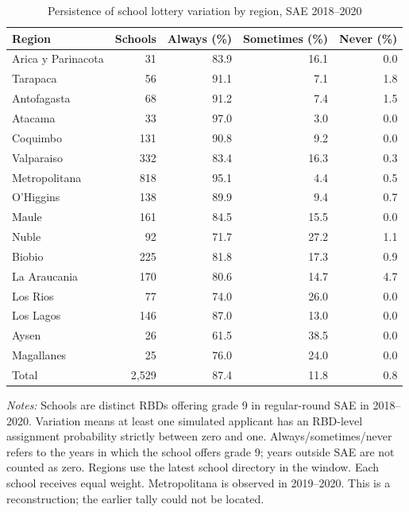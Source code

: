 \begin{table}[!htbp]\centering
\caption{Persistence of school lottery variation by region, SAE 2018--2020}
\label{tab:lottery-variation-region}
\small
\begin{tabular}{lrrrr}\hline\hline
Region & Schools & Always (\%) & Sometimes (\%) & Never (\%) \\ \hline
Arica y Parinacota & 31 & 83.9 & 16.1 & 0.0 \\
Tarapaca & 56 & 91.1 & 7.1 & 1.8 \\
Antofagasta & 68 & 91.2 & 7.4 & 1.5 \\
Atacama & 33 & 97.0 & 3.0 & 0.0 \\
Coquimbo & 131 & 90.8 & 9.2 & 0.0 \\
Valparaiso & 332 & 83.4 & 16.3 & 0.3 \\
Metropolitana & 818 & 95.1 & 4.4 & 0.5 \\
O'Higgins & 138 & 89.9 & 9.4 & 0.7 \\
Maule & 161 & 84.5 & 15.5 & 0.0 \\
Nuble & 92 & 71.7 & 27.2 & 1.1 \\
Biobio & 225 & 81.8 & 17.3 & 0.9 \\
La Araucania & 170 & 80.6 & 14.7 & 4.7 \\
Los Rios & 77 & 74.0 & 26.0 & 0.0 \\
Los Lagos & 146 & 87.0 & 13.0 & 0.0 \\
Aysen & 26 & 61.5 & 38.5 & 0.0 \\
Magallanes & 25 & 76.0 & 24.0 & 0.0 \\
Total & 2,529 & 87.4 & 11.8 & 0.8 \\
\hline\hline\end{tabular}
\begin{minipage}{0.98\textwidth}\footnotesize
\textit{Notes:} Schools are distinct RBDs offering grade 9 in regular-round SAE in 2018--2020. Variation means at least one simulated applicant has an RBD-level assignment probability strictly between zero and one. Always/sometimes/never refers to the years in which the school offers grade 9; years outside SAE are not counted as zero. Regions use the latest school directory in the window. Each school receives equal weight. Metropolitana is observed in 2019--2020. This is a reconstruction; the earlier tally could not be located.
\end{minipage}
\end{table}
